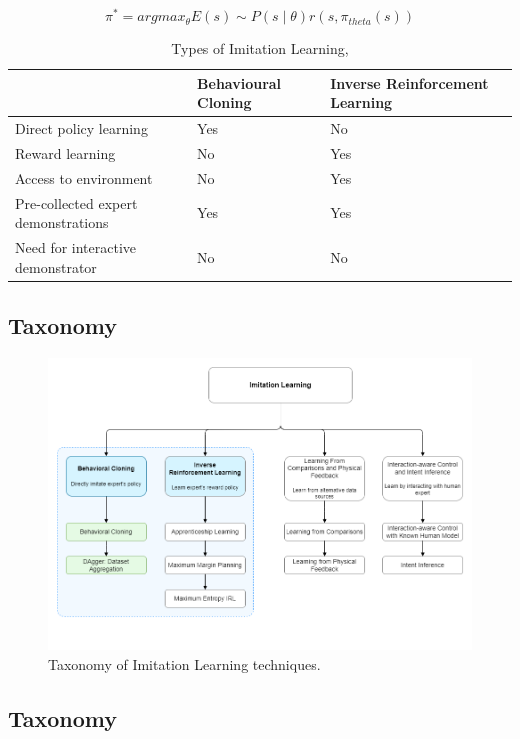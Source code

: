 \documentclass{article}
\begin{document}
\begin{equation}\label{eq:IRL}
	\pi^* = argmax_\theta E(s) \sim P(s\mid\theta)r(s,\pi_{theta}(s))
\end{equation}

\begingroup
\setlength{\tabcolsep}{6pt}
\begin{table}[h!]
	\centering
	\renewcommand{\arraystretch}{1.5} 
	\begin{tabular}{L{6cm} L{3cm} L{3cm}}
		\midrule[0.01pt]
		& \textbf{Behavioural Cloning} & \textbf{Inverse Reinforcement Learning}\\
		\midrule[0.01pt]
		Direct policy learning & Yes & No \\
		Reward learning & No & Yes \\
		Access to environment & No & Yes \\
		Pre-collected expert demonstrations & Yes & Yes \\
		Need for interactive demonstrator & No & No \\
		\midrule[0.01pt]
	\end{tabular}
	\caption{Types of Imitation Learning, \cite{yue2018imitation}}
	\label{tbl:BC_IRL}
\end{table}
\endgroup



\subsection{Taxonomy}

\begin{figure}[h]
	\centering
	\includegraphics[width=0.75\linewidth]{images/IRL_Taxonomy.png}
	\caption{Taxonomy of Imitation Learning techniques.}
	\label{fig:taxonomy}
\end{figure}



\subsection{Taxonomy}
\end{document}
